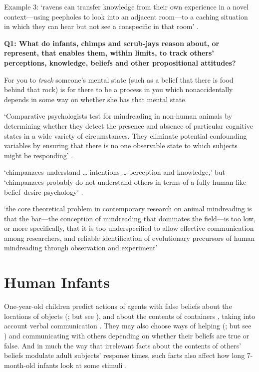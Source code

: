 \documentclass[12pt]{extarticle}
\begin{document}
\begin{multicols*}{3}
Example 3: ‘ravens can transfer knowledge from their own experience in a novel context---using peepholes to look
into an adjacent room---to a caching situation in which they can hear but not see a conspecific in that
room’ \citep{bugnyar:2016_ravens}.

\textbf{Q1: What do infants, chimps and scrub-jays reason about, or represent, that enables them, within limits, to track others’ perceptions, knowledge, beliefs and other propositional attitudes?}

For you to \emph{track} someone’s mental state (such as a belief that there is food behind that rock)
is for there to be a process in you which nonaccidentally depends in some way on whether she has that
mental state.

‘Comparative psychologists test for mindreading in non-human animals by determining whether they
detect the presence and absence of particular cognitive states in a wide variety of
circumstances.
They eliminate potential confounding variables by ensuring that there is no one
observable state to which subjects might be responding’
\citep[p.~487]{halina:2015_there}.

‘chimpanzees understand … intentions … perception and knowledge,’ but ‘chimpanzees probably do not
understand others in terms of a fully human-like belief–desire psychology’
\citet[p.~191]{Call:2008di}.

‘the core theoretical problem in contemporary research on animal mindreading is that the bar—the
conception of mindreading that dominates the field—is too low, or more specifically, that it is
too underspecified to allow effective communication among researchers, and reliable
identification of evolutionary precursors of human mindreading through observation and experiment’
\citep[p.~318]{heyes:2014_animal}


\section{Human Infants}

One-year-old children predict actions of agents with false beliefs about the
locations of objects (\citealp{Clements:1994cw,Onishi:2005hm,Southgate:2007js}; but see \citealp{kulke:2017_replication}),
and about the contents of containers \citep{he:2011_false}, taking into
account verbal communication \citep{Song:2008qo,scott:2012_verbal_fb}.
They
may also choose ways of helping (\citealp[]{Buttelmann:2009gy}; but see \citealp{crivello:2017_helping}) and
communicating \citep{Knudsen:2011fk,southgate:2010fb} with others depending on
whether their beliefs are true or false. And in much the way that irrelevant
facts about the contents of others’ beliefs modulate adult subjects’ response
times, such facts also affect how long 7-month-old infants look at some
stimuli \citep[]{kovacs_social_2010}.


\end{multicols*}
\end{document}
